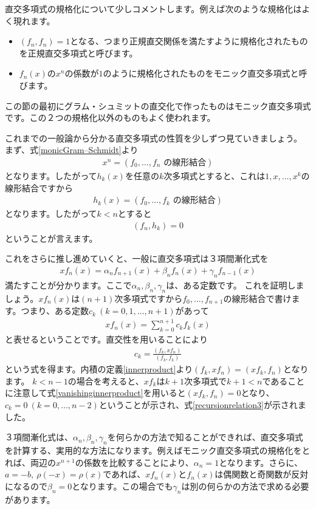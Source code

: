 \documentclass[report,paper=a4, fontsize=12pt, line_length=16cm, number_of_lines=33,dvipdfmx]{jlreq}
\numberwithin{equation}{section}
\begin{document}
直交多項式の規格化について少しコメントします。例えば次のような規格化はよく現れます。
\begin{itemize}
  \item $(f_n,f_n)=1$となる、つまり正規直交関係を満たすように規格化されたものを正規直交多項式と呼びます。
  \item $f_n(x)$の$x^n$の係数が$1$のように規格化されたものをモニック直交多項式と呼びます。
\end{itemize}
この節の最初にグラム・シュミットの直交化で作ったものはモニック直交多項式です。この２つの規格化以外のものもよく使われます。

これまでの一般論から分かる直交多項式の性質を少しずつ見ていきましょう。
まず、式\eqref{monicGram–Schmidt}より
\begin{align}
  x^n=(f_0,\dots,f_n \text{ の線形結合})
\end{align}
となります。したがって$h_k(x)$を任意の$k$次多項式とすると、これは$1,x,\dots,x^k$の線形結合ですから
\begin{align}
  h_k(x)=(f_0,\dots,f_k \text{ の線形結合})
\end{align}
となります。したがって$k<n$とすると
\begin{align}
  (f_n,h_k)=0\label{vanishinginnerproduct}
\end{align}
ということが言えます。

これをさらに推し進めていくと、一般に直交多項式は３項間漸化式を
\begin{align}
  xf_n(x)=\alpha_n f_{n+1}(x)+\beta_n f_n(x)+\gamma_n f_{n-1}(x)
  \label{recursionrelation3}
\end{align}
満たすことが分かります。ここで$\alpha_n,\beta_n,\gamma_n$は、ある定数です。
これを証明しましょう。$xf_n(x)$は$(n+1)$次多項式ですから$f_0,\dots,f_{n+1}$の線形結合で書けます。つまり、ある定数$c_{k}\ (k=0,1,\dots,n+1)$があって
\begin{align}
  xf_n(x)=\sum_{k=0}^{n+1}c_{k}f_{k}(x)
\end{align}
と表せるということです。直交性を用いることにより
\begin{align}
  c_k=\frac{(f_k,xf_n)}{(f_k,f_k)}
\end{align}
という式を得ます。内積の定義\eqref{innerproduct}より$(f_k,xf_n)=(xf_k,f_n)$となります。
$k<n-1$の場合を考えると、$xf_k$は$k+1$次多項式で$k+1<n$であることに注意して式\eqref{vanishinginnerproduct}を用いると$(xf_k,f_n)=0$となり、$c_k=0\ (k=0,\dots, n-2)$ということが示され、式\eqref{recursionrelation3}が示されました。

３項間漸化式は、$\alpha_n,\beta_n,\gamma_n$を何らかの方法で知ることができれば、直交多項式を計算する、実用的な方法になります。例えばモニック直交多項式の規格化をとれば、両辺の$x^{n+1}$の係数を比較することにより、$\alpha_n=1$となります。さらに、$a=-b,\ \rho(-x)=\rho(x)$であれば、$xf_n(x)$と$f_n(x)$は偶関数と奇関数が反対になるので$\beta_n=0$となります。この場合でも$\gamma_n$は別の何らかの方法で求める必要があります。
\end{document}
